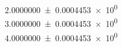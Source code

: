 

\num{2.0000000 \pm 0.0004453 e0}  \\
\num{3.0000000 \pm 0.0004453 e0}  \\
\num{4.0000000 \pm 0.0004453 e0}  \\
